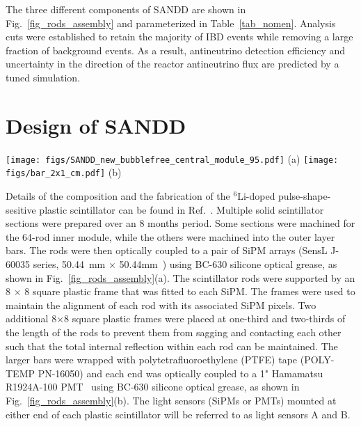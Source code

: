 \documentclass[final,5p,times,twocolumn]{elsarticle}
\begin{document}
The three different components of SANDD are shown in Fig.~\ref{fig_rods_assembly} and parameterized in Table~\ref{tab_nomen}. 
Analysis cuts were established to retain the majority of IBD events while removing a large fraction of background events.
As a result, antineutrino detection efficiency and uncertainty in the direction of the reactor antineutrino flux are predicted by a tuned simulation.

\section{Design of SANDD}

\begin{figure*}[ht!]
	\begin{center}
    \texttt{[image: figs/SANDD\_new\_bubblefree\_central\_module\_95.pdf]}
(a)
    \texttt{[image: figs/bar\_2x1\_cm.pdf]}
(b)
    \end{center}
    \caption{SANDD consists of (a)~sixty-four $^6$Li-loaded plastic-scintillator rods, each of $0.54 \times 0.54 \times 40.6$~cm$^3$ dimensions, that are assembled into the $8 \times 8$-grid support frames and attached to the SiPM arrays (component 1) and (b)~larger cross section bars (2.54~cm $\times$ 2.54~cm $\times$ 40.6~cm and 5.08~cm $\times$ 2.54~cm $\times$ 40.6~cm) of the same material that are wrapped in PTFE tape and attached to 1" PMTs (component 2 and component 3).} \label{fig_rods_assembly}
\end{figure*}

Details of the composition and the fabrication of the $^6$Li-doped pulse-shape-sesitive plastic scintillator can be found in Ref.~\cite{Mabe_2019}. Multiple solid scintillator sections were prepared over an 8 months period. %
Some sections were machined for the 64-rod inner module, while the others were machined into the outer layer bars.
The rods were then optically coupled to a pair of SiPM arrays (SensL J-60035 series, 50.44~mm $\times$ 50.44mm~\cite{sensl_specSheet}) using BC-630 silicone optical grease, as shown in Fig.~\ref{fig_rods_assembly}(a). 
The scintillator rods were supported by an 8 $\times$ 8 square plastic frame that was fitted to each SiPM. The frames were used to maintain the alignment of each rod with its associated SiPM pixels.
Two additional 8$\times$8 square plastic frames were placed at one-third and two-thirds of the length of the rods to prevent them from sagging and contacting each other such that the total internal reflection within each rod can be maintained.
The larger bars were wrapped with polytetrafluoroethylene (PTFE) tape (POLY-TEMP PN-16050) and each end was optically coupled to a 1" Hamamatsu R1924A-100 PMT~\cite{hamamatsu_specSheet} using BC-630 silicone optical grease, as shown in Fig.~\ref{fig_rods_assembly}(b).
The light sensors (SiPMs or PMTs) mounted at either end of each plastic scintillator will be referred to as light sensors A and B.
\end{document}
